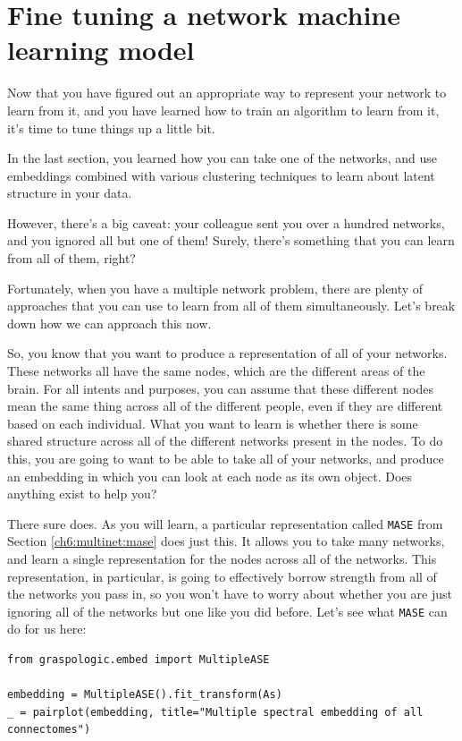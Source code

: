 \section{Fine tuning a network machine learning model}
\label{sec:ch2:finetune}

Now that you have figured out an appropriate way to represent your network to learn from it, and you have learned how to train an algorithm to learn from it, it's time to tune things up a little bit.

In the last section, you learned how you can take one of the networks, and use embeddings combined with various clustering techniques to learn about latent structure in your data.

However, there's a big caveat: your colleague sent you over a hundred networks, and you ignored all but one of them! Surely, there's something that you can learn from all of them, right?

Fortunately, when you have a multiple network problem, there are plenty of approaches that you can use to learn from all of them simultaneously. Let's break down how we can approach this now.

So, you know that you want to produce a representation of all of your networks. These networks all have the same nodes, which are the different areas of the brain. For all intents and purposes, you can assume that these different nodes mean the same thing across all of the different people, even if they are different based on each individual. What you want to learn is whether there is some {shared} structure across all of the different networks present in the nodes. To do this, you are going to want to be able to take {all} of your networks, and produce an embedding in which you can look at each {node} as its own object. Does anything exist to help you?

There sure does. As you will learn, a particular representation called \texttt{MASE} from Section \ref{ch6:multinet:mase} does just this. It allows you to take many networks, and learn a single representation for the nodes across all of the networks. This representation, in particular, is going to effectively {borrow strength} from all of the networks you pass in, so you won't have to worry about whether you are just ignoring all of the networks but one like you did before. Let's see what \texttt{MASE} can do for us here:


\begin{lstlisting}[style=python]
from graspologic.embed import MultipleASE

embedding = MultipleASE().fit_transform(As)
_ = pairplot(embedding, title="Multiple spectral embedding of all connectomes")
\end{lstlisting}


